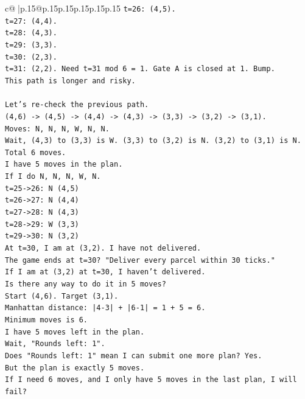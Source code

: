 \documentclass{article}
\begin{document}
{\begin{supertabular}{c@{$\;$}|p{.15\linewidth}@{}p{.15\linewidth}p{.15\linewidth}p{.15\linewidth}p{.15\linewidth}p{.15\linewidth}}
{{{\texttt{t=26: (4,5).} \\
\texttt{t=27: (4,4).} \\
\texttt{t=28: (4,3).} \\
\texttt{t=29: (3,3).} \\
\texttt{t=30: (2,3).} \\
\texttt{t=31: (2,2). Need t=31 mod 6 = 1. Gate A is closed at 1. Bump.} \\
\texttt{This path is longer and risky.} \\
\\ 
\texttt{Let's re{-}check the previous path.} \\
\texttt{(4,6) {-}> (4,5) {-}> (4,4) {-}> (4,3) {-}> (3,3) {-}> (3,2) {-}> (3,1).} \\
\texttt{Moves: N, N, N, W, N, N.} \\
\texttt{Wait, (4,3) to (3,3) is W. (3,3) to (3,2) is N. (3,2) to (3,1) is N.} \\
\texttt{Total 6 moves.} \\
\texttt{I have 5 moves in the plan.} \\
\texttt{If I do N, N, N, W, N.} \\
\texttt{t=25{-}>26: N (4,5)} \\
\texttt{t=26{-}>27: N (4,4)} \\
\texttt{t=27{-}>28: N (4,3)} \\
\texttt{t=28{-}>29: W (3,3)} \\
\texttt{t=29{-}>30: N (3,2)} \\
\texttt{At t=30, I am at (3,2). I have not delivered.} \\
\texttt{The game ends at t=30? "Deliver every parcel within 30 ticks."} \\
\texttt{If I am at (3,2) at t=30, I haven't delivered.} \\
\texttt{Is there any way to do it in 5 moves?} \\
\texttt{Start (4,6). Target (3,1).} \\
\texttt{Manhattan distance: |4{-}3| + |6{-}1| = 1 + 5 = 6.} \\
\texttt{Minimum moves is 6.} \\
\texttt{I have 5 moves left in the plan.} \\
\texttt{Wait, "Rounds left: 1".} \\
\texttt{Does "Rounds left: 1" mean I can submit one more plan? Yes.} \\
\texttt{But the plan is exactly 5 moves.} \\
\texttt{If I need 6 moves, and I only have 5 moves in the last plan, I will fail?} \\
}}}
\end{supertabular}}
\end{document}

